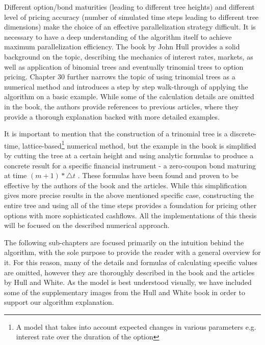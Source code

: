 Different option/bond maturities (leading to different tree heights) and different level of pricing accuracy (number of simulated time steps leading to different tree dimensions) make the choice of an effective parallelization strategy difficult. It is necessary to have a deep understanding of the algorithm itself to achieve maximum parallelization efficiency. The book by John Hull\cite{ofod} provides a solid background on the topic, describing the mechanics of interest rates, markets, as well as application of binomial trees and eventually trinomial trees to option pricing. Chapter 30 further narrows the topic of using trinomial trees as a numerical method and introduces a step by step walk-through of applying the algorithm on a basic example. While some of the calculation details are omitted in the book, the authors provide references to previous articles\cite{npfits}\cite{uhwirt}, where they provide a thorough explanation backed with more detailed examples. 

\newpage
It is important to mention that the construction of a trinomial tree is a discrete-time, lattice-based\footnote{A model that takes into account expected changes in various parameters e.g. interest rate over the duration of the option} numerical method, but the example in the book is simplified by cutting the tree at a certain height and using analytic formulas to produce a concrete result for a specific financial instrument - a zero-coupon bond maturing at time $(m + 1) * \triangle t$ \cite[pg. 704]{ofod}. These formulas have been found and proven to be effective by the authors of the book and the articles. While this simplification gives more precise results in the above mentioned specific case, constructing the entire tree and using all of the time steps provides a foundation for pricing other options with more sophisticated cashflows. All the implementations of this thesis will be focused on the described numerical approach.

The following sub-chapters are focused primarily on the intuition behind the algorithm, with the sole purpose to provide the reader with a general overview for it. For this reason, many of the details and formulas of calculating specific values are omitted, however they are thoroughly described in the book and the articles by Hull and White. As the model is best understood visually, we have included some of the supplementary images from the Hull and White book in order to support our algorithm explanation.

